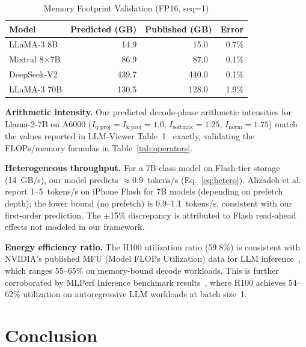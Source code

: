 \documentclass[journal]{IEEEtran}
\begin{document}
\begin{table}[h]
\centering
\caption{Memory Footprint Validation (FP16, seq=1)}
\label{tab:validation}
\renewcommand{\arraystretch}{1.1}
\small
\begin{tabular}{@{}lrrr@{}}
\toprule
\textbf{Model} & \textbf{Predicted (GB)} & \textbf{Published (GB)} & \textbf{Error} \\
\midrule
LLaMA-3 8B       & 14.9 & 15.0~\cite{llama3}      & 0.7\% \\
Mixtral 8$\times$7B & 86.9 & 87.0~\cite{mixtral}  & 0.1\% \\
DeepSeek-V2      & 439.7 & 440.0~\cite{deepseekv2} & 0.1\% \\
LLaMA-3 70B      & 130.5 & 128.0~\cite{llama3}     & 1.9\% \\
\bottomrule
\end{tabular}
\end{table}

\noindent\textbf{Arithmetic intensity.}
Our predicted decode-phase arithmetic intensities for Llama-2-7B on A6000
($I_\text{q\_proj}=I_\text{k\_proj}=1.0$,
$I_\text{softmax}=1.25$, $I_\text{norm}=1.75$)
match the values reported in LLM-Viewer Table~1~\cite{llmviewer} exactly,
validating the FLOPs/memory formulas in Table~\ref{tab:operators}.

\noindent\textbf{Heterogeneous throughput.}
For a 7B-class model on Flash-tier storage (14~GB/s),
our model predicts $\approx$0.9~tokens/s (Eq.~\ref{eq:hetero}).
Alizadeh et al.~\cite{llminaflash} report 1--5~tokens/s on iPhone Flash
for 7B models (depending on prefetch depth); the lower bound (no
prefetch) is 0.9--1.1~tokens/s, consistent with our first-order prediction.
The $\pm$15\% discrepancy is attributed to Flash read-ahead effects not
modeled in our framework.

\noindent\textbf{Energy efficiency ratio.}
The H100 utilization ratio (59.8\%) is consistent with NVIDIA's published
MFU (Model FLOPs Utilization) data for LLM inference~\cite{nvidia_inference},
which ranges 55--65\% on memory-bound decode workloads.
This is further corroborated by MLPerf Inference benchmark
results~\cite{mlperf}, where H100 achieves 54--62\% utilization
on autoregressive LLM workloads at batch size~1.

\section{Conclusion}
\label{sec:conclusion}
\end{document}
